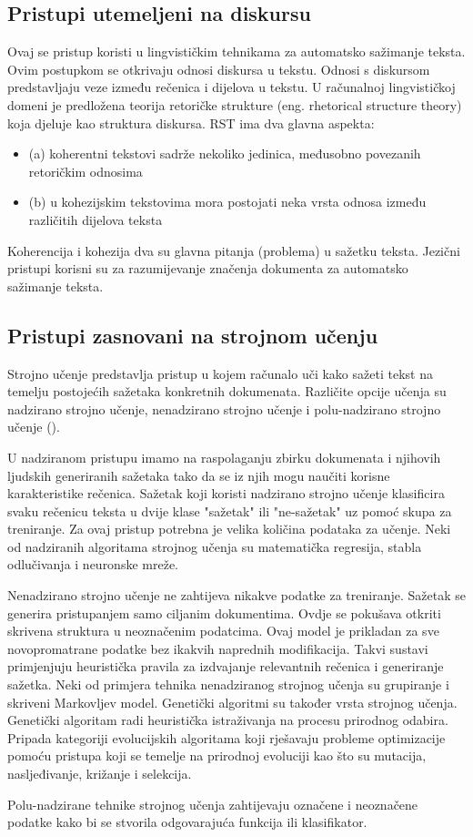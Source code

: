 \documentclass[times, utf8, zavrsni, numeric]{fer}
\begin{document}
\subsection{Pristupi utemeljeni na diskursu}
Ovaj se pristup koristi u lingvističkim tehnikama za automatsko sažimanje teksta.
Ovim postupkom se otkrivaju odnosi diskursa u tekstu. Odnosi s diskursom predstavljaju veze između rečenica i dijelova u tekstu.
U računalnoj lingvističkoj domeni je predložena teorija retoričke strukture (eng. rhetorical structure theory) koja djeluje kao struktura diskursa.
RST ima dva glavna aspekta:
\begin{itemize}
  \item (a) koherentni tekstovi sadrže nekoliko jedinica, međusobno povezanih retoričkim odnosima
  \item (b) u kohezijskim tekstovima mora postojati neka vrsta odnosa između različitih dijelova teksta
\end{itemize}
Koherencija i kohezija dva su glavna pitanja (problema) u sažetku teksta.
Jezični pristupi korisni su za razumijevanje značenja dokumenta za automatsko sažimanje teksta.
\subsection{Pristupi zasnovani na strojnom učenju}
Strojno učenje predstavlja pristup u kojem računalo uči kako sažeti tekst na temelju postojećih sažetaka konkretnih dokumenata.
Različite opcije učenja su nadzirano strojno učenje, nenadzirano strojno učenje i polu-nadzirano strojno učenje (\citet{article1}).
\par
U nadziranom pristupu imamo na raspolaganju zbirku dokumenata i njihovih ljudskih generiranih sažetaka tako da se iz njih mogu naučiti korisne karakteristike rečenica.
Sažetak koji koristi nadzirano strojno učenje klasificira svaku rečenicu teksta u dvije klase "sažetak" ili "ne-sažetak" uz pomoć skupa za treniranje.
Za ovaj pristup potrebna je velika količina podataka za učenje.
Neki od nadziranih algoritama strojnog učenja su matematička regresija, stabla odlučivanja i neuronske mreže.
\par
Nenadzirano strojno učenje ne zahtijeva nikakve podatke za treniranje. Sažetak se generira pristupanjem samo ciljanim dokumentima.
Ovdje se pokušava otkriti skrivena struktura u neoznačenim podatcima.
Ovaj model je prikladan za sve novopromatrane podatke bez ikakvih naprednih modifikacija.
Takvi sustavi primjenjuju heuristička pravila za izdvajanje relevantnih rečenica i generiranje sažetka.
Neki od primjera tehnika nenadziranog strojnog učenja su grupiranje i skriveni Markovljev model.
Genetički algoritmi su također vrsta strojnog učenja. Genetički algoritam radi heuristička istraživanja na procesu prirodnog odabira. Pripada kategoriji evolucijskih algoritama koji rješavaju probleme optimizacije pomoću pristupa koji se temelje na prirodnoj evoluciji kao što su mutacija, nasljeđivanje, križanje i selekcija.
\par
Polu-nadzirane tehnike strojnog učenja zahtijevaju označene i neoznačene podatke kako bi se stvorila odgovarajuća funkcija ili klasifikator.
\end{document}
